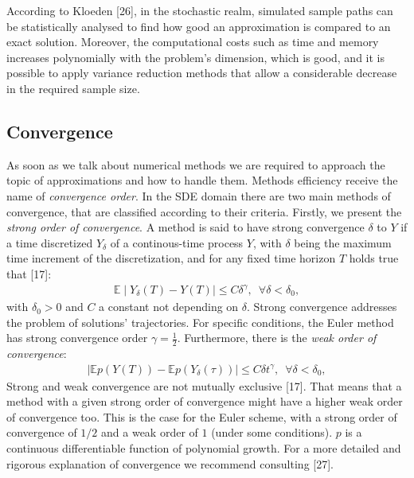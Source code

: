 \documentclass[12pt,oneside]{reedthesis}
\theoremstyle{definition}
\theoremstyle{definition}
\theoremstyle{remark}
\begin{document}
  According to Kloeden {[}26{]}, in the stochastic realm, simulated sample
  paths can be statistically analysed to find how good an approximation is
  compared to an exact solution. Moreover, the computational costs such as
  time and memory increases polynomially with the problem's dimension,
  which is good, and it is possible to apply variance reduction methods
  that allow a considerable decrease in the required sample size.
  
  \subsection{Convergence}\label{convergence}
  
  As soon as we talk about numerical methods we are required to approach
  the topic of approximations and how to handle them. Methods efficiency
  receive the name of \emph{convergence order}. In the SDE domain there
  are two main methods of convergence, that are classified according to
  their criteria. Firstly, we present the \emph{strong order of
  convergence}. A method is said to have strong convergence \(\delta\) to
  \(Y\) if a time discretized \(Y_{\delta}\) of a continous-time process
  \(Y\), with \(\delta\) being the maximum time increment of the
  discretization, and for any fixed time horizon \(T\) holds true that
  {[}17{]}:
  \begin{align*}
  \mathbb{E} \mid Y_{\delta}(T) - Y(T) \mid \leq C \delta^{\gamma}, \,\,\, \forall \delta < \delta_0,
  \end{align*}
  with \(\delta_0 > 0\) and \(C\) a constant not depending on \(\delta\).
  Strong convergence addresses the problem of solutions' trajectories. For
  specific conditions, the Euler method has strong convergence order
  \(\gamma = \frac{1}{2}\). Furthermore, there is the \emph{weak order of
  convergence}:
  \begin{align*}
  \mid  \mathbb{E}p(Y(T)) - \mathbb{E}p(Y_\delta(\tau)) \mid \leq C \delta t^{\gamma}, \,\,\, \forall \delta < \delta_0,
  \end{align*}
  Strong and weak convergence are not mutually exclusive {[}17{]}. That
  means that a method with a given strong order of convergence might have
  a higher weak order of convergence too. This is the case for the Euler
  scheme, with a strong order of convergence of \(1/2\) and a weak order
  of \(1\) (under some conditions). \(p\) is a continuous differentiable
  function of polynomial growth. For a more detailed and rigorous
  explanation of convergence we recommend consulting {[}27{]}.
  
\end{document}
